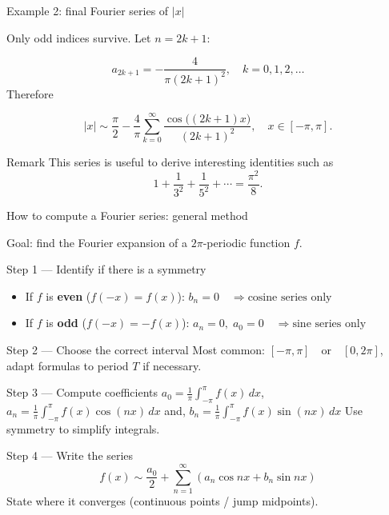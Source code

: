 \documentclass[aspectratio=169]{beamer}
\begin{document}
\begin{frame}{Example 2: final Fourier series of $|x|$}

Only odd indices survive. Let $n=2k+1$:

\[
a_{2k+1} = -\frac{4}{\pi (2k+1)^2},\quad k=0,1,2,\dots
\]
\pause
Therefore

\[
|x| \sim \frac{\pi}{2}
-\frac{4}{\pi}\sum_{k=0}^{\infty}
\frac{\cos\big((2k+1)x\big)}{(2k+1)^2},
\quad x\in[-\pi,\pi].
\]
\pause
\begin{block}{Remark}
This series is useful to derive interesting identities such as
\[
1 + \frac{1}{3^2} + \frac{1}{5^2} + \cdots = \frac{\pi^2}{8}.
\]
\end{block}

\end{frame}

\begin{frame}{How to compute a Fourier series: general method}

Goal: find the Fourier expansion of a $2\pi$-periodic function $f$.
\pause
\begin{block}{Step 1 — Identify if there is a symmetry}
\begin{itemize}
    \item If $f$ is \textbf{even} ($f(-x)=f(x)$): $
    b_n = 0 \quad \Rightarrow \text{cosine series only}
    $
    \item If $f$ is \textbf{odd} ($f(-x)=-f(x)$):
    $
    a_n = 0,\; a_0=0 \quad \Rightarrow \text{sine series only}
    $
\end{itemize}
\end{block}
\pause
\vspace{-5mm}
\begin{block}{Step 2 — Choose the correct interval}
Most common: $
[-\pi,\pi] \quad \text{or} \quad [0,2\pi]
$, adapt formulas to period $T$ if necessary.
\end{block}
\pause
\begin{block}{Step 3 — Compute coefficients}
$
a_0=\frac{1}{\pi}\int_{-\pi}^{\pi} f(x)\,dx
$, $
a_n=\frac{1}{\pi}\int_{-\pi}^{\pi} f(x)\cos(nx)\,dx
$ and, $
b_n=\frac{1}{\pi}\int_{-\pi}^{\pi} f(x)\sin(nx)\,dx
$
Use symmetry to simplify integrals.
\end{block}
\pause
\begin{block}{Step 4 — Write the series}
\[
f(x)\sim \frac{a_0}{2}+\sum_{n=1}^{\infty}
\left(a_n\cos nx + b_n\sin nx\right)
\]
State where it converges (continuous points / jump midpoints).
\end{block}

\end{frame}
\end{document}
